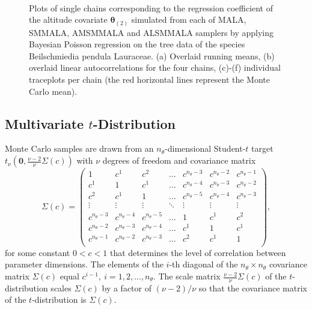 \documentclass[twoside,11pt]{article}
\begin{document}
\begin{figure}
{	}
	 \\ 
	\caption{Plots of single chains corresponding to the regression coefficient of the altitude covariate
		$\boldsymbol{\theta}_{(2)}$ simulated from each of MALA, SMMALA, AMSMMALA and ALSMMALA samplers by applying Bayesian 
		Poisson regression on the tree data of the species Beilschmiedia pendula Lauraceae. (a) Overlaid running means, (b) 
		overlaid linear autocorrelations for the four chains, (c)-(f) individual traceplots per chain (the red horizontal lines 
		represent the Monte Carlo mean).}
	\label{fig:poisson}
\end{figure}

\subsection{Multivariate $t$-Distribution}

Monte Carlo samples are drawn from an $n_{\theta}$-dimensional Student-$t$ target
$t_{\nu}(\mathbf{0},\frac{\nu-2}{\nu}\Sigma(c))$ with $\nu$ degrees of freedom and covariance matrix
\begin{equation}
\label{tp:eq:normal:sigma}
\Sigma(c)=\left(\begin{array}{ccccccc}
1 & c^1 & c^2 & \dots & c^{n_{\theta}-3} & c^{n_{\theta}-2} & c^{n_{\theta}-1} \\
c^1 & 1 & c^1 & \dots & c^{n_{\theta}-4} & c^{n_{\theta}-3} & c^{n_{\theta}-2} \\
c^2 & c^1 & 1 & \dots & c^{n_{\theta}-5} & c^{n_{\theta}-4} & c^{n_{\theta}-3} \\
\vdots & \vdots & \vdots & \ddots & \vdots & \vdots & \vdots \\
c^{n_{\theta}-3} & c^{n_{\theta}-4} & c^{n_{\theta}-5} & \dots & 1 & c^{1} & c^{2} \\
c^{n_{\theta}-2} & c^{n_{\theta}-3} & c^{n_{\theta}-4} & \dots & c^{1} & 1 & c^{1} \\
c^{n_{\theta}-1} & c^{n_{\theta}-2} & c^{n_{\theta}-3} & \dots & c^{2} & c^1 & 1 \\
\end{array}\right),
\end{equation}
for some constant $0<c<1$ that determines the level of correlation between parameter dimensions. The elements of the 
$i$-th diagonal of the $n_{\theta}\times n_{\theta}$ covariance matrix $\Sigma(c)$ equal $c^{i-1},~i=1,2,\dots,n_{\theta}$.
The scale matrix $\frac{\nu-2}{\nu}\Sigma(c)$ of the $t$-distribution scales $\Sigma(c)$ by a factor of $(\nu-2)/\nu$ so 
that the covariance matrix of the $t$-distribution is $\Sigma(c)$.
\end{document}
